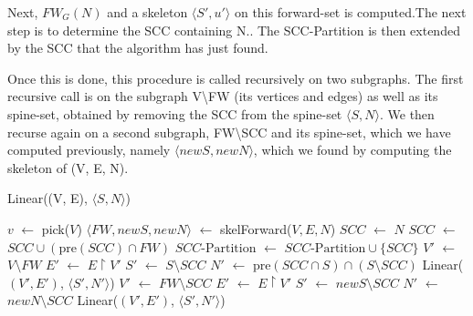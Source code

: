 \documentclass[../master/master.tex]{subfiles}
\newcommand{\FW}[2][G]{\ensuremath{FW_{#1}(#2)}}
\newcommand{\pair}[2]{\ensuremath{\langle #1, #2\rangle}}
\newcommand*\Let[2]{\State #1 $\gets$ #2}
\begin{document}
Next, \FW{N} and a skeleton \pair{S'}{u'} on this forward-set is computed.The next step is to determine the SCC containing N.. The SCC-Partition is then extended by the SCC that the algorithm has just found. 

Once this is done, this procedure is called recursively on two subgraphs. The first recursive call is on the subgraph V\textbackslash FW (its vertices and edges) as well as its spine-set, obtained by removing the SCC from the spine-set \pair{S}{N}. We then recurse again on a second subgraph, FW\textbackslash SCC and its spine-set, which we have computed previously, namely \pair{newS}{newN}, which we found by computing the skeleton of (V, E, N).


\begin{algorithm}
  \caption{Linear((V, E), \pair{S}{N})}
  \begin{algorithmic}[1]
     \State \Return
    \EndIf
    \Statex
      \Let{$v$}{pick($V$)}
    \EndIf
    \Statex
    \Let{$\langle FW, newS, newN\rangle$}{skelForward($V, E, N$)}
    \Statex
    \Let{$SCC$}{$N$}
     \Let{$SCC$}{$SCC\cup (\text{pre}(SCC)\cap FW)$}
    \EndWhile
    \Statex
    \Let{$SCC\text{-Partition}$}{$SCC\text{-Partition}\cup\{SCC\}$}
    \Statex
    \Let{$V'$}{$V\setminus FW$}
    \Let{$E'$}{$E\upharpoonright V'$}
    \Let{$S'$}{$S\setminus SCC$}
    \Let{$N'$}{$\text{pre}(SCC\cap S)\cap(S\setminus SCC)$}
    \State Linear($(V', E')$, \pair{S'}{N'})
    \Statex
    \Let{$V'$}{$FW\setminus SCC$}
    \Let{$E'$}{$E\upharpoonright V'$}
    \Let{$S'$}{$newS\setminus SCC$}
    \Let{$N'$}{$newN\setminus SCC$}
    \State Linear($(V', E')$, \pair{S'}{N'})
  \end{algorithmic}
\end{algorithm}
\end{document}
